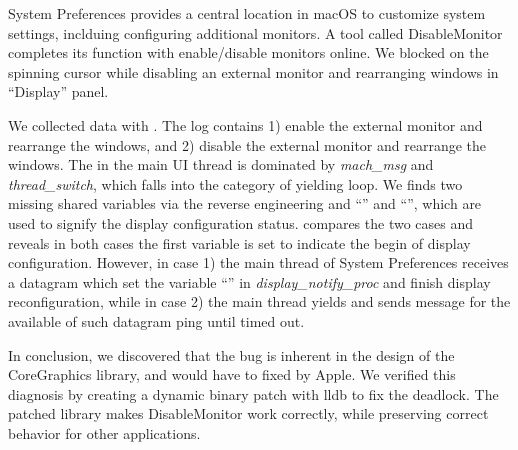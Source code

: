 System Preferences provides a central location in macOS to customize
system settings, inclduing configuring additional monitors. A tool called
DisableMonitor~\cite{disablemonitor} completes its function with enable/disable
monitors online. We blocked on the spinning cursor while disabling an external
monitor and rearranging windows in ``Display'' panel.

We collected data with \xxx. The log contains 1) enable the external
monitor and rearrange the windows, and 2) disable the external monitor and
rearrange the windows. The \spinningnode in the main UI thread is dominated by
\textit{mach\_msg} and \textit{thread\_switch}, which falls into the category of
yielding loop. We finds two missing shared variables via the reverse engineering
and ``'' and ``'',
which are used to signify the display configuration status.
\xxx compares the two cases and reveals in both cases the first variable is
set to indicate the begin of display configuration. However, in case 1) the
main thread of System Preferences receives a datagram which set the variable
``'' in \textit{display\_notify\_proc} and finish
display reconfiguration, while in case 2) the main thread yields and sends
message for the available of such datagram ping until timed out.

In conclusion, we discovered that the bug is inherent in the design of the
CoreGraphics library, and would have to fixed by Apple. We verified this
diagnosis by creating a dynamic binary patch with lldb to fix the deadlock. The
patched library makes DisableMonitor work correctly, while preserving correct
behavior for other applications.

